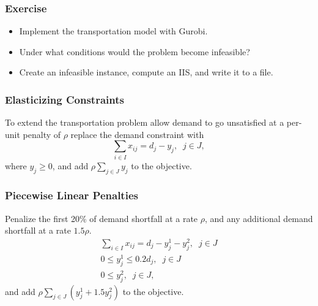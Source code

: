 \documentclass[12pt,handout]{beamer}
\begin{document}
{
\begin{frame}
\frametitle{Exercise}
\begin{itemize}
\item Implement the transportation model with Gurobi.
\item Under what conditions would the problem become infeasible?
\item Create an infeasible instance, compute an IIS, and write it to a file.
\end{itemize}
\end{frame}
}

\begin{frame}
\frametitle{Elasticizing Constraints}
To extend the transportation problem allow demand to go unsatisfied at a per-unit penalty of $\rho$ replace the demand constraint with
\begin{equation}
\sum_{i \in I} x_{ij} = d_j - y_j,\;\;j \in J, \nonumber
\end{equation}
\noindent where $y_j \ge 0$, and add $\rho \sum_{j \in J} y_j$ to the objective.
\end{frame}

\begin{frame}
\frametitle{Piecewise Linear Penalties}
Penalize the first 20\% of demand shortfall at a rate $\rho$, and any additional demand shortfall at a rate $1.5\rho$.
\begin{eqnarray}
\sum_{i \in I} x_{ij} = d_j - y_j^1 - y_j^2,\;\;j \in J \nonumber \\
0 \le y_j^1 \le 0.2d_j,\;\;j \in J \nonumber \\
0 \le y_j^2,\;\;j \in J, \nonumber
\end{eqnarray}
\noindent and add $\rho \sum_{j \in J} (y_j^1 + 1.5 y_j^2)$ to the objective.


\end{frame}
\end{document}

